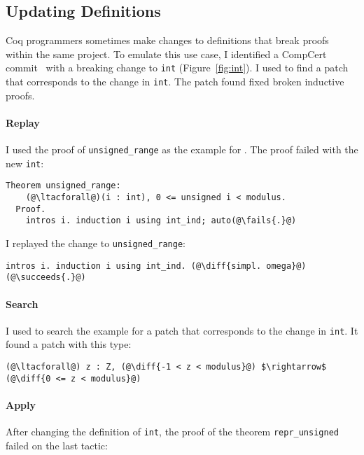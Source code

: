 \lstset{language=coq, aboveskip=3pt,belowskip=3pt}

\subsection{Updating Definitions}
\label{sec:compcert}

Coq programmers sometimes make changes to definitions that break proofs
within the same project. To emulate this use case, 
I identified a CompCert commit~\cite{compcertcommit}
with a breaking change to \lstinline{int} (Figure~\ref{fig:int}). %
I used \sysname to find a patch that corresponds to the change in \lstinline{int}.
The patch \sysname found fixed broken inductive proofs.

\paragraph{Replay} I used the proof of \lstinline{unsigned_range} as the example for \sysname.
The proof failed with the new \lstinline{int}:

\lstset{language=coq, aboveskip=3pt,belowskip=3pt}
\begin{lstlisting}[language=coq]
  Theorem unsigned_range:
    (@\ltacforall@)(i : int), 0 <= unsigned i < modulus.
  Proof.
    intros i. induction i using int_ind; auto(@\fails{.}@)
\end{lstlisting}
I replayed the change to \lstinline{unsigned_range}:

\begin{lstlisting}[language=coq]
    intros i. induction i using int_ind. (@\diff{simpl. omega}@)(@\succeeds{.}@)
\end{lstlisting}

\paragraph{Search} I used \sysname to search the example for a patch that corresponds to the change in \lstinline{int}. It found
a patch with this type:

\begin{lstlisting}[language=coq]
   (@\ltacforall@) z : Z, (@\diff{-1 < z < modulus}@) $\rightarrow$ (@\diff{0 <= z < modulus}@)
\end{lstlisting}

\paragraph{Apply} After changing the definition of \lstinline{int}, the proof of the
theorem \lstinline{repr_unsigned} failed on the last tactic:

